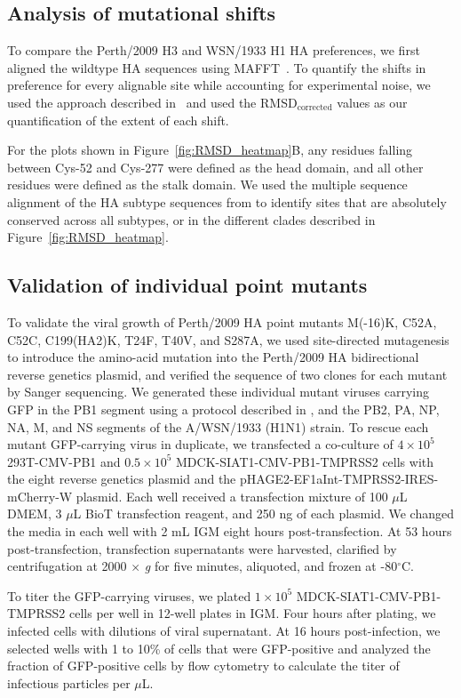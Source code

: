 \documentclass[9pt,twocolumn,twoside]{pnas-new}
\providecommand{\DIFaddend}{} %
\begin{document}
{\subsection*{Analysis of mutational shifts}
To compare the Perth/2009 H3 and WSN/1933 H1 HA preferences, we first aligned the wildtype HA sequences using MAFFT~\cite{katoh2013mafft}.
To quantify the shifts in preference for every alignable site while accounting for experimental noise, we used the approach described in~\cite{haddox2018mapping} and used the RMSD$_{\text{corrected}}$ values as our quantification of the extent of each shift.

For the plots shown in Figure~\ref{fig:RMSD_heatmap}B, any residues falling between Cys-52 and Cys-277 were defined as the head domain, and all other residues were defined as the stalk domain.
We used the multiple sequence alignment of the HA subtype sequences from \cite{doud2018quantifying} to identify sites that are absolutely conserved across all subtypes, or in the different clades described in Figure~\ref{fig:RMSD_heatmap}.

\subsection*{Validation of individual point mutants}
To validate the viral growth of Perth/2009 HA point mutants M(-16)K, C52A, C52C, C199(HA2)K, T24F, T40V, and S287A, we used site-directed mutagenesis to introduce the amino-acid mutation into the Perth/2009 HA bidirectional reverse genetics plasmid, and verified the sequence of two clones for each mutant by Sanger sequencing.
We generated these individual mutant viruses carrying GFP in the PB1 segment using a protocol described in \cite{hooper2013mutant}, and the PB2, PA, NP, NA, M, and NS segments of the A/WSN/1933 (H1N1) strain.
To rescue each mutant GFP-carrying virus in duplicate, we transfected a co-culture of $4 \times 10^5$ 293T-CMV-PB1 and $0.5 \times 10^5$ MDCK-SIAT1-CMV-PB1-TMPRSS2 cells with the eight reverse genetics plasmid and the pHAGE2-EF1aInt-TMPRSS2-IRES-mCherry-W plasmid.
Each well received a transfection mixture of 100 $\mu$L DMEM, 3 $\mu$L BioT transfection reagent, and 250 ng of each plasmid.
We changed the media in each well with 2 mL IGM eight hours post-transfection.
At 53 hours post-transfection, transfection supernatants were harvested, clarified by centrifugation at 2000 $\times$ \textit{g} for five minutes, aliquoted, and frozen at -80$^\circ$C.

To titer the GFP-carrying viruses, we plated $1 \times 10^5$ MDCK-SIAT1-CMV-PB1-TMPRSS2 cells per well in 12-well plates in IGM.
Four hours after plating, we infected cells with dilutions of viral supernatant.
At 16 hours post-infection, we selected wells with 1 to 10\% of cells that were GFP-positive and analyzed the fraction of GFP-positive cells by flow cytometry to calculate the titer of infectious particles per $\mu$L.

}
\DIFaddend 
\end{document}
